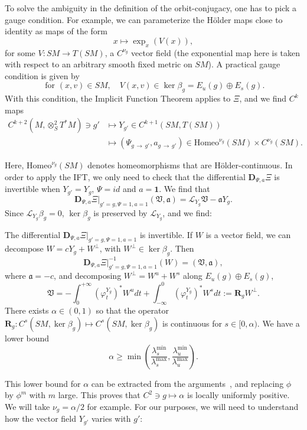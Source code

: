 \documentclass[AHL,Unicode,longabstracts,published]{cedram}
\newcommand{\RR}{\mathbf{R}}
\newcommand{\bdD}{\mathbf{D}}
\newcommand{\bfun}{\mathbf{1}}
\newcommand{\ClL}{\mathcal{L}}
\newcommand{\fkV}{\mathfrak{V}}
\newcommand{\fka}{\mathfrak{a}}
\newcommand{\Homeo}{\mathrm{Homeo}}
\begin{document}
To solve the ambiguity in the definition of the orbit-conjugacy, one has to pick a gauge condition. For example, we can parameterize the H\"older maps close to identity as maps of the form
\[
x \mapsto \exp_x (V(x)),
\]
for some $V:SM \to T(SM)$, a $C^{\nu_g}$ vector field (the exponential map here is taken with respect to an arbitrary smooth fixed metric on $SM$). A practical gauge condition is given by
\[
\text{ for } (x,v) \in SM,\quad V(x,v) \in \ker \beta_g = E_u(g) \oplus E_s(g).
\]
With this condition, the Implicit Function Theorem applies to $\Xi$, and we find $C^k$ maps
\begin{align*}
C^{k+2}\left(M,\otimes^2_S T^*M\right) \owns g' &\mapsto Y_{g'} \in C^{k+1}(SM,T(SM)) \\
&\mapsto \left(\Psi_{g\,\to\,g'}, a_{g\,\to\,g'}\right) \in \Homeo^{\nu_g}(SM) \times C^{\nu_g}(SM).
\end{align*}

Here, $\Homeo^{\nu_g}(SM)$ denotes homeomorphisms that are H\"older-continuous. In order to apply the IFT, we only need to check that the differential $\bdD_{\Psi,a}\Xi$ is invertible when $Y_{g'}=Y_g$, $\Psi=id$ and $a=\bfun$. We find that
\[
\bdD_{\Psi,a}\Xi|_{g'=g,\Psi=1,a=1} (\fkV,\fka) = \ClL_{Y_g} \fkV - \fka Y_g.
\]
Since $\ClL_{Y_g} \beta_g = 0$, $\ker \beta_g$ is preserved by $\ClL_{Y_g}$, and we find:



\begin{lemm}\label{lemma:dllm}
The differential $\bdD_{\Psi,a}\Xi|_{g'=g,\Psi=1,a=1}$ is invertible. If $W$ is a vector field, we can decompose $W = c Y_g + W^{\perp}$, with $W^\perp \in \ker \beta_g$. Then
\[
\bdD_{\Psi,a}\Xi|_{g'=g,\Psi=1,a=1}^{-1}(W) = (\fkV,\fka),
\]
where $\fka= - c$, and decomposing $W^\perp = W^u + W^s$ along $E_u(g)\oplus E_s(g)$,
\[
\fkV = - \int_0^{+\infty} \left(\varphi^{Y_g}_t\right)^\ast W^u dt + \int_{-\infty}^0 \left(\varphi^{Y_g}_t\right)^\ast W^s dt := \RR_g W^{\perp}.
\]
There exists $\alpha\in(0,1)$ so that the operator $\RR_g : C^s(SM,\ker \beta_g) \mapsto C^s(SM,\ker \beta_g)$ is continuous for $s\in [0,\alpha)$. We have a lower bound
\[
\alpha \geq \min\left(\frac{\lambda_s^{\min}}{\lambda_s^{\max}}, \frac{\lambda_u^{\min}}{\lambda_u^{\max}} \right).
\]
\end{lemm}

This lower bound for $\alpha$ can be extracted from the arguments~\cite[p.~593] {Katok-Knieper-Pollicott-Weiss-89}, and replacing $\phi$ by $\phi^m$ with $m$ large. This proves that $C^2\ni g \mapsto \alpha$ is locally uniformly positive. We will take $\nu_g = \alpha/2$ for example. For our purposes, we will need to understand how the vector field $Y_{g'}$ varies with $g'$:
\end{document}
